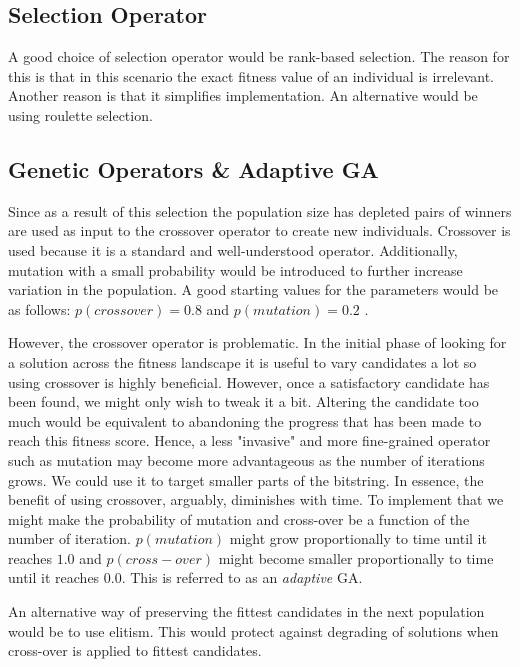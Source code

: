 \documentclass[a4paper, 12pt, titlepage]{article}
\begin{document}
\subsection*{Selection Operator}

A good choice of selection operator would be rank-based selection. The
reason for this is that in this scenario the exact fitness value of
an individual is irrelevant. Another reason is that it simplifies
implementation. An alternative would be using roulette selection.

\subsection*{Genetic Operators \& Adaptive GA}

Since as a result of this selection the population size has depleted
pairs of winners are used as input to the crossover operator to
create new individuals.  Crossover is used because it is a standard
and well-understood operator.  Additionally, mutation with a small
probability would be introduced to further increase variation in the
population. A good starting values for the parameters would be as follows:
\(p(crossover) = 0.8\) and \(p(mutation) = 0.2\) \cite{heaton2014}.

However, the crossover operator is problematic. In the initial phase of
looking for a solution across the fitness landscape it is useful to vary
candidates a lot so using crossover is highly beneficial. However, once
a satisfactory candidate has been found, we might only wish to tweak it
a bit. Altering the candidate too much would be equivalent to abandoning
the progress that has been made to reach this fitness score. Hence,
a less "invasive" and more fine-grained operator such as mutation may
become more advantageous as the number of iterations grows. We could use
it to target smaller parts of the bitstring. In essence, the benefit of
using crossover, arguably, diminishes with time. To implement that we
might make the probability of mutation and cross-over be a function of
the number of iteration. \(p(mutation)\) might grow proportionally to
time until it reaches \(1.0\) and \(p(cross-over)\) might become smaller
proportionally to time until it reaches \(0.0\). This is referred to as 
an \emph{adaptive} GA.

An alternative way of preserving the fittest candidates in the next
population would be to use elitism. This would protect against degrading
of solutions when cross-over is applied to fittest candidates.
\end{document}
